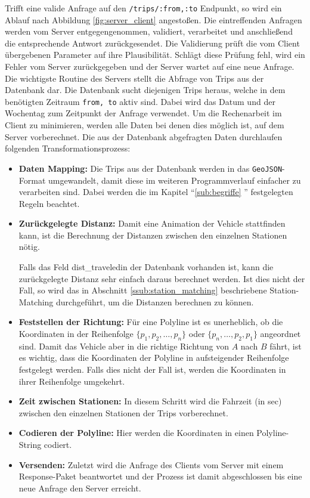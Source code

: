   Trifft eine valide Anfrage auf den \texttt{/trips/:from,:to} Endpunkt, so wird ein Ablauf nach Abbildung \ref{fig:server_client} angestoßen.
  Die eintreffenden Anfragen werden vom Server entgegengenommen, validiert, verarbeitet und anschließend die entsprechende Antwort zurückgesendet. Die Validierung prüft die vom Client übergebenen Parameter auf ihre Plausibilität. Schlägt diese Prüfung fehl, wird ein Fehler vom Server zurückgegeben und der Server wartet auf eine neue Anfrage. Die wichtigste Routine des Servers stellt die Abfrage von Trips aus der Datenbank dar. Die Datenbank sucht diejenigen Trips heraus, welche in dem benötigten Zeitraum \texttt{from, to} aktiv sind. Dabei wird das Datum und der Wochentag zum Zeitpunkt der Anfrage verwendet. Um die Rechenarbeit im Client zu minimieren, werden alle Daten bei denen dies möglich ist, auf dem Server vorberechnet. Die aus der Datenbank abgefragten Daten durchlaufen folgenden Transformationsprozess:

  \begin{itemize}
    \item \textbf{Daten Mapping:} Die Trips aus der Datenbank werden in das \texttt{GeoJSON}-Format umgewandelt, damit diese im weiteren Programmverlauf einfacher zu verarbeiten sind. Dabei werden die im Kapitel "`\ref{sub:begriffe} "' festgelegten Regeln beachtet.

    \item \textbf{Zurückgelegte Distanz:} Damit eine Animation der Vehicle stattfinden kann, ist die Berechnung der Distanzen zwischen den einzelnen Stationen nötig. 

    Falls das Feld dist\_traveled\footnotemark in der Datenbank vorhanden ist, kann die zurückgelegte Distanz sehr einfach daraus berechnet werden. Ist dies nicht der Fall, so wird das in Abschnitt \ref{ssub:station_matching} beschriebene Station-Matching durchgeführt, um die Distanzen berechnen zu können.

    \item \textbf{Feststellen der Richtung:} Für eine Polyline ist es unerheblich, ob die Koordinaten in der Reihenfolge $\{ p_1, p_2, \dotsc, p_n \}$ oder $\{ p_n, \dotsc, p_2, p_1 \}$ angeordnet sind. Damit das Vehicle aber in die richtige Richtung von $A$ nach $B$ fährt, ist es wichtig, dass die Koordinaten der Polyline in aufsteigender Reihenfolge festgelegt werden. Falls dies nicht der Fall ist, werden die Koordinaten in ihrer Reihenfolge umgekehrt.

    \item \textbf{Zeit zwischen Stationen:} In diesem Schritt wird die Fahrzeit (in sec) zwischen den einzelnen Stationen der Trips vorberechnet.

    \item \textbf{Codieren der Polyline:} Hier werden die Koordinaten in einen Polyline-String codiert.

    \item \textbf{Versenden:} Zuletzt wird die Anfrage des Clients vom Server mit einem Response-Paket beantwortet und der Prozess ist damit abgeschlossen bis eine neue Anfrage den Server erreicht.
  \end{itemize}
    
